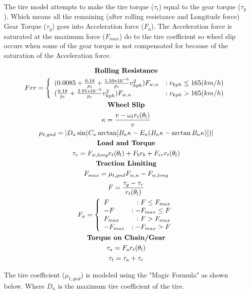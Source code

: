 \documentclass[../SimBALink.tex]{subfiles}
\begin{document}
The tire model attempts to make the tire torque ($\tau_t$) equal to the gear torque ($\tau_g$). Which means all the remaining (after rolling resistance and Longitude force) Gear Torque ($\tau_g$) goes into Acceleration force ($F_a$). The Acceleration force is saturated at the maximum force ($F_{max}$) do to the tire coefficient so wheel slip occurs when some of the gear torque is not compensated for because of the saturation of the Acceleration force.

\begin{gather}
\notag \textbf{Rolling Resistance} \\
Frr = 
\left\{
  \begin{array}{lr}
    (0.0085 + \frac{0.18}{p_t} + \frac{1.59*10^{-6}}{p_t}v_{kph}^2)F_{w,n} & : v_{kph} \le 165 (km/h)\\
    (\frac{0.18}{p_t} + \frac{2.91*10^{-6}}{p_t}v_{kph}^2)F_{w,n} & : v_{kph} > 165 (km/h)
  \end{array}
\right. \\
\notag \textbf{Wheel Slip} \\
\kappa = \frac{v - \omega_t r_t(\theta_l)}{v} \\
\mu_{t,gnd} = \left| D_{\kappa}\sin(C_{\kappa} \arctan[B_{\kappa}\kappa - E_{\kappa}(B_{\kappa}\kappa - \arctan B_{\kappa}\kappa)]) \right| \\
\notag \textbf{Load and Torque} \\
\tau_r = F_{w,long}r_t(\theta_l) + F_br_b + F_{rr}r_t(\theta_l) \\
\notag \textbf{Traction Limiting} \\
F_{max} = \mu_{t,gnd} F_{w,n} - F_{w,long} \\
F = \frac{\tau_g - \tau_r}{r_t(\theta_l)} \\
F_a =
\left\{
  \begin{array}{lr}
	F 	& : F \le F_{max} \\
	-F 	& : -F_{max} \le F \\
	F_{max} & : F > F_{max} \\
	-F_{max} & : -F_{max} > F
  \end{array}
\right. \\
\notag \textbf{Torque on Chain/Gear} \\
\tau_a = F_ar_t(\theta_l) \\
\tau_t = \tau_a + \tau_r
\end{gather}

The tire coefficient ($\mu_{t,gnd}$) is modeled using the "Magic Formula" as shown below. Where $D_{\kappa}$ is the maximum tire coefficient of the tire. 
\end{document}
